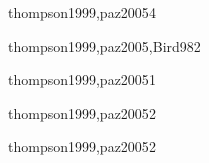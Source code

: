 \begin{syllabus}
\begin{unit}{\PLSIXDef}{thompson1999,paz2005}{4}
   \begin{learningoutcomes}
      \item \PLSIXObjTHREE
      \item \PLSIXObjFOUR
      \item \PLSIXObjFIVE
   \end{learningoutcomes}
\end{unit}

\begin{unit}{\SEFIVEDef}{thompson1999,paz2005,Bird98}{2}
   \begin{topics}
      \item \SEFIVETopicConceptos
   \end{topics}

   \begin{learningoutcomes}
      \item \SEFIVEObjFIVE
   \end{learningoutcomes}
\end{unit}

\begin{unit}{\SEONEDef}{thompson1999,paz2005}{1}

   \begin{topics}
      \item \SEONETopicConceptos
   \end{topics}

   \begin{learningoutcomes}
      \item \SEONEObjONE
   \end{learningoutcomes}
\end{unit}

\begin{unit}{\SETHREEDef}{thompson1999,paz2005}{2}
   \begin{topics}
      \item \SETHREETopicEntornos
      \item \SETHREETopicAnalisis
   \end{topics}

   \begin{learningoutcomes}
      \item \SETHREEObjONE
   \end{learningoutcomes}
\end{unit}

\begin{unit}{\SETWODef}{thompson1999,paz2005}{2}
   \begin{topics}
      \item \SETWOTopicProgramacion
      \item \SETWOTopicProgramacionpor
   \end{topics}

   \begin{learningoutcomes}
      \item \SETWOObjONE
   \end{learningoutcomes}
\end{unit}

\begin{coursebibliography}

\end{coursebibliography}
\end{syllabus}
